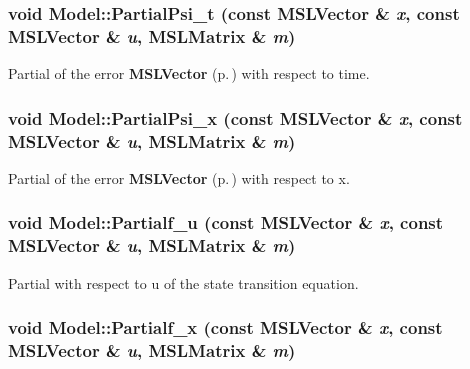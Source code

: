 \subsubsection{\setlength{\rightskip}{0pt plus 5cm}void Model::Partial\-Psi\_\-t (const {\bf MSLVector} \& {\em x}, const {\bf MSLVector} \& {\em u}, {\bf MSLMatrix} \& {\em m})\hspace{0.3cm}{\tt  [inline, virtual]}}\label{class_Model_a20}


Partial of the error {\bf MSLVector} {\rm (p.\,\pageref{class_MSLVector})} with respect to time.

\subsubsection{\setlength{\rightskip}{0pt plus 5cm}void Model::Partial\-Psi\_\-x (const {\bf MSLVector} \& {\em x}, const {\bf MSLVector} \& {\em u}, {\bf MSLMatrix} \& {\em m})\hspace{0.3cm}{\tt  [inline, virtual]}}\label{class_Model_a19}


Partial of the error {\bf MSLVector} {\rm (p.\,\pageref{class_MSLVector})} with respect to x.

\subsubsection{\setlength{\rightskip}{0pt plus 5cm}void Model::Partialf\_\-u (const {\bf MSLVector} \& {\em x}, const {\bf MSLVector} \& {\em u}, {\bf MSLMatrix} \& {\em m})\hspace{0.3cm}{\tt  [inline, virtual]}}\label{class_Model_a11}


Partial with respect to u of the state transition equation.

\subsubsection{\setlength{\rightskip}{0pt plus 5cm}void Model::Partialf\_\-x (const {\bf MSLVector} \& {\em x}, const {\bf MSLVector} \& {\em u}, {\bf MSLMatrix} \& {\em m})\hspace{0.3cm}{\tt  [inline, virtual]}}\label{class_Model_a10}


